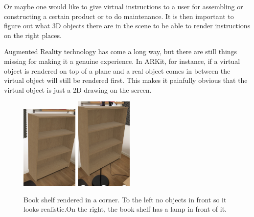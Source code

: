 Or maybe one would like to give virtual instructions to a user for assembling or constructing a certain product or to do maintenance. It is then important to figure out what 3D objects there are in the scene to be able to render instructions on the right places.

Augmented Reality technology has come a long way, but there are still things missing for making it a genuine experience. In ARKit, for instance, if a virtual object is rendered on top of a plane and a real object comes in between the virtual object will still be rendered first. This makes it painfully obvious that the virtual object is just a 2D drawing on the screen.

\begin{figure}[hbtp]
\begin{center}
\includegraphics[width = 0.25\textwidth]{./Images/overlapping2.jpg} 
\includegraphics[width = 0.25\textwidth]{./Images/overlapping1.jpg} 
\caption{Book shelf rendered in a corner. To the left no objects in front so it looks realistic.On the right, the book shelf has a lamp in front of it.}
\end{center}
\end{figure}

\newpage
